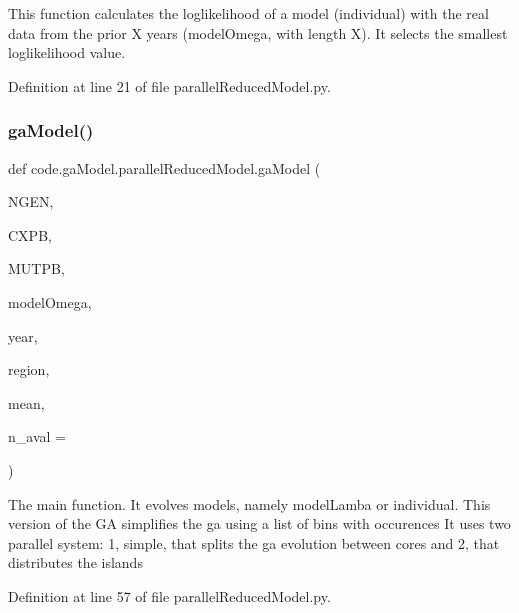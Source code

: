\begin{DoxyVerb}This function calculates the loglikelihood of a model (individual) with 
the real data from the prior X years (modelOmega, with length X).
It selects the smallest loglikelihood value.
\end{DoxyVerb}
 

Definition at line 21 of file parallel\+Reduced\+Model.\+py.

\mbox{\label{namespacecode_1_1ga_model_1_1parallel_reduced_model_a897e7048ecbba7fd1155868a9b8858f9}} 
\subsubsection{\texorpdfstring{ga\+Model()}{gaModel()}}
{\footnotesize\ttfamily def code.\+ga\+Model.\+parallel\+Reduced\+Model.\+ga\+Model (\begin{DoxyParamCaption}\item[{}]{N\+G\+EN,  }\item[{}]{C\+X\+PB,  }\item[{}]{M\+U\+T\+PB,  }\item[{}]{model\+Omega,  }\item[{}]{year,  }\item[{}]{region,  }\item[{}]{mean,  }\item[{}]{n\+\_\+aval = {} }\end{DoxyParamCaption})}

\begin{DoxyVerb}The main function. It evolves models, namely modelLamba or individual. 
This version of the GA simplifies the ga using a list of bins with occurences
It uses two parallel system: 1, simple, that splits the ga evolution between cores
and 2, that distributes the islands
\end{DoxyVerb}
 

Definition at line 57 of file parallel\+Reduced\+Model.\+py.

\mbox{\label{namespacecode_1_1ga_model_1_1parallel_reduced_model_aae0733eaea88fe32d2b0f982402ae160}} 
